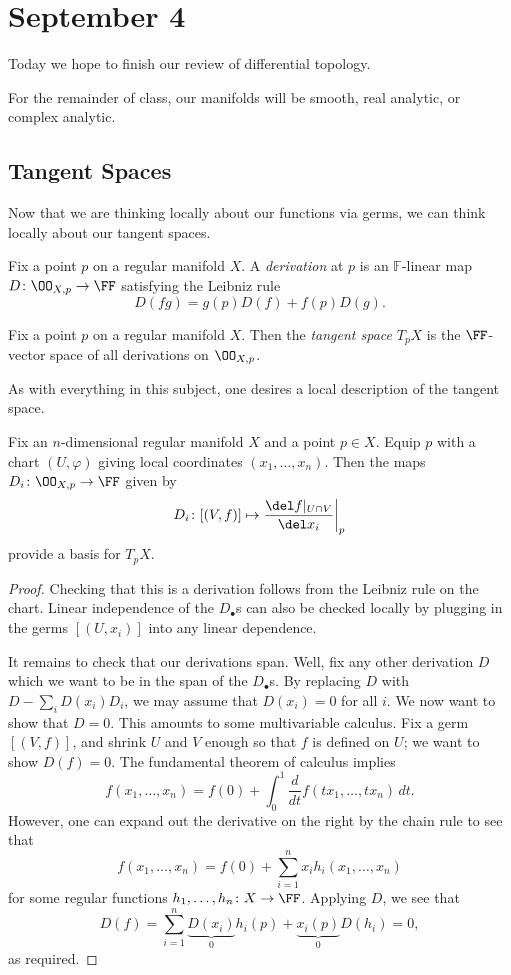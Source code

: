 \documentclass[../notes.tex]{subfiles}
\begin{document}
\section{September 4}

Today we hope to finish our review of differential topology.
\begin{conv}
	For the remainder of class, our manifolds will be smooth, real analytic, or complex analytic.
\end{conv}

\subsection{Tangent Spaces}
Now that we are thinking locally about our functions via germs, we can think locally about our tangent spaces.
\begin{definition}[derivation]
	Fix a point $p$ on a regular manifold $X$. A \textit{derivation} at $p$ is an $\mathbb F$-linear map $D\colon\OO_{X,p}\to\FF$ satisfying the Leibniz rule
	\[D(fg)=g(p)D(f)+f(p)D(g).\]
\end{definition}
\begin{definition}
	Fix a point $p$ on a regular manifold $X$. Then the \textit{tangent space} $T_pX$ is the $\FF$-vector space of all derivations on $\OO_{X,p}$.
\end{definition}
As with everything in this subject, one desires a local description of the tangent space.
\begin{lemma}
	Fix an $n$-dimensional regular manifold $X$ and a point $p\in X$. Equip $p$ with a chart $(U,\varphi)$ giving local coordinates $(x_1,\ldots,x_n)$. Then the maps $D_i\colon\OO_{X,p}\to\FF$ given by
	\[D_i\colon[(V,f)]\mapsto\frac{\del f|_{U\cap V}}{\del x_i}\bigg|_p\]
	provide a basis for $T_pX$.
\end{lemma}
\begin{proof}
	Checking that this is a derivation follows from the Leibniz rule on the chart. Linear independence of the $D_\bullet$s can also be checked locally by plugging in the germs $[(U,x_i)]$ into any linear dependence.
	
	It remains to check that our derivations span. Well, fix any other derivation $D$ which we want to be in the span of the $D_\bullet$s. By replacing $D$ with $D-\sum_iD(x_i)D_i$, we may assume that $D(x_i)=0$ for all $i$. We now want to show that $D=0$. This amounts to some multivariable calculus. Fix a germ $[(V,f)]$, and shrink $U$ and $V$ enough so that $f$ is defined on $U$; we want to show $D(f)=0$. The fundamental theorem of calculus implies
	\[f(x_1,\ldots,x_n)=f(0)+\int_0^1\frac d{dt}f(tx_1,\ldots,tx_n)\,dt.\]
	However, one can expand out the derivative on the right by the chain rule to see that
	\[f(x_1,\ldots,x_n)=f(0)+\sum_{i=1}^nx_ih_i(x_1,\ldots,x_n)\]
	for some regular functions $h_1,\ldots,h_n\colon X\to\FF$. Applying $D$, we see that
	\[D(f)=\sum_{i=1}^n\underbrace{D(x_i)}_0h_i(p)+\underbrace{x_i(p)}_0D(h_i)=0,\]
	as required.
\end{proof}
\end{document}
